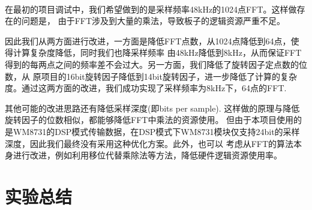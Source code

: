 \documentclass[12pt]{article}
\begin{document}
\paragraph{}在最初的项目调试中，我们希望做到的是采样频率48kHz的1024点FFT。这样做存在的问题是，
由于FFT涉及到大量的乘法，导致板子的逻辑资源严重不足。

因此我们从两方面进行改进，一方面是降低FFT点数，从1024点降低到64点，使得计算复杂度降低，同时我们也降采样频率
由48kHz降低到8kHz，从而保证FFT得到的每两点之间的频率差不会过大。另一方面，我们降低了旋转因子定点数的位数，从
原项目的16bit旋转因子降低到14bit旋转因子，进一步降低了计算的复杂度。通过这两方面的改进，我们成功实现了采样频率为8kHz下，64点的FFT.

其他可能的改进思路还有降低采样深度(即bits per sample). 这样做的原理与降低旋转因子的位数相似，都能够降低FFT中乘法的资源使用。
但由于本项目使用的是WM8731的DSP模式传输数据，在DSP模式下WM8731模块仅支持24bit的采样深度，因此我们最终没有采用这种优化方案。此外，也可以
考虑从FFT的算法本身进行改进，例如利用移位代替乘除法等方法，降低硬件逻辑资源使用率。

\section{实验总结}
\end{document}
